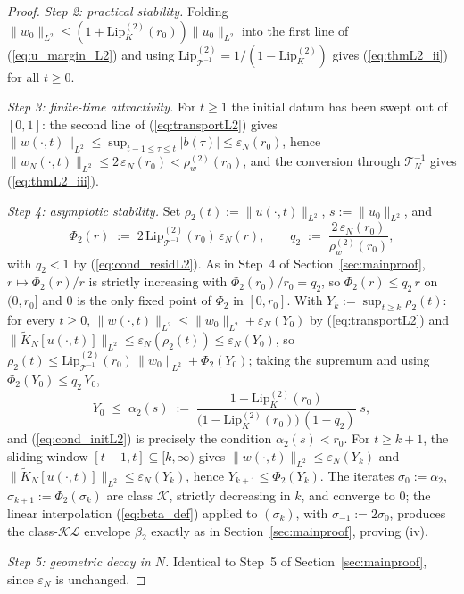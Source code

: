 \documentclass[amsthm]{autart}
\theoremstyle{plain}
\theoremstyle{definition}
\newcommand{\Tcal}{\mathcal{T}}
\newcommand{\Ltwo}{L^2}
\newcommand{\Lipk}{\mathrm{Lip}_K}
\newcommand{\LipT}{\mathrm{Lip}_{\Tcal^{-1}}}
\newcommand{\eps}{\varepsilon}
\begin{document}
\begin{proof}
\emph{Step 2: practical stability.} Folding $\|w_0\|_{\Ltwo} \le (1 + \Lipk^{(2)}(r_0))\|u_0\|_{\Ltwo}$ into the first line of (\ref{eq:u_margin_L2}) and using $\LipT^{(2)} = 1/(1 - \Lipk^{(2)})$ gives (\ref{eq:thmL2_ii}) for all $t \ge 0$.

\emph{Step 3: finite-time attractivity.} For $t \ge 1$ the initial datum has been swept out of $[0,1]$: the second line of (\ref{eq:transportL2}) gives $\|w(\cdot,t)\|_{\Ltwo} \le \sup_{t-1 \le \tau \le t}|b(\tau)| \le \eps_N(r_0)$, hence $\|w_N(\cdot,t)\|_{\Ltwo} \le 2\,\eps_N(r_0) < \rho_w^{(2)}(r_0)$, and the conversion through $\Tcal_N^{-1}$ gives (\ref{eq:thmL2_iii}).

\emph{Step 4: asymptotic stability.} Set $\rho_2(t) := \|u(\cdot,t)\|_{\Ltwo}$, $s := \|u_0\|_{\Ltwo}$, and
\begin{equation}
\Phi_2(r) \;:=\; 2\,\LipT^{(2)}(r_0)\,\eps_N(r), \qquad q_2 \;:=\; \frac{2\,\eps_N(r_0)}{\rho_w^{(2)}(r_0)},
\label{eq:Phi2def}
\end{equation}
with $q_2 < 1$ by (\ref{eq:cond_residL2}). As in Step~4 of Section~\ref{sec:mainproof}, $r \mapsto \Phi_2(r)/r$ is strictly increasing with $\Phi_2(r_0)/r_0 = q_2$, so $\Phi_2(r) \le q_2\, r$ on $(0, r_0]$ and $0$ is the only fixed point of $\Phi_2$ in $[0, r_0]$. With $Y_k := \sup_{t \ge k}\rho_2(t)$: for every $t \ge 0$, $\|w(\cdot,t)\|_{\Ltwo} \le \|w_0\|_{\Ltwo} + \eps_N(Y_0)$ by (\ref{eq:transportL2}) and $\|\widetilde K_N[u(\cdot,t)]\|_{\Ltwo} \le \eps_N(\rho_2(t)) \le \eps_N(Y_0)$, so $\rho_2(t) \le \LipT^{(2)}(r_0)\,\|w_0\|_{\Ltwo} + \Phi_2(Y_0)$; taking the supremum and using $\Phi_2(Y_0) \le q_2\, Y_0$,
\begin{equation}
Y_0 \;\le\; \alpha_2(s) \;:=\; \frac{1 + \Lipk^{(2)}(r_0)}{\bigl(1 - \Lipk^{(2)}(r_0)\bigr)\,(1 - q_2)}\; s,
\label{eq:alpha2def}
\end{equation}
and (\ref{eq:cond_initL2}) is precisely the condition $\alpha_2(s) < r_0$. For $t \ge k+1$, the sliding window $[t-1, t] \subseteq [k, \infty)$ gives $\|w(\cdot,t)\|_{\Ltwo} \le \eps_N(Y_k)$ and $\|\widetilde K_N[u(\cdot,t)]\|_{\Ltwo} \le \eps_N(Y_k)$, hence $Y_{k+1} \le \Phi_2(Y_k)$. The iterates $\sigma_0 := \alpha_2$, $\sigma_{k+1} := \Phi_2(\sigma_k)$ are class $\mathcal{K}$, strictly decreasing in $k$, and converge to $0$; the linear interpolation (\ref{eq:beta_def}) applied to $(\sigma_k)$, with $\sigma_{-1} := 2\sigma_0$, produces the class-$\mathcal{KL}$ envelope $\beta_2$ exactly as in Section~\ref{sec:mainproof}, proving (iv).

\emph{Step 5: geometric decay in $N$.} Identical to Step~5 of Section~\ref{sec:mainproof}, since $\eps_N$ is unchanged.
\end{proof}
\end{document}
